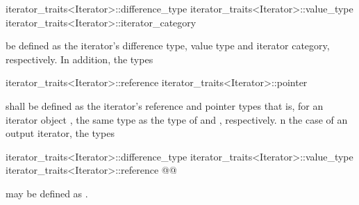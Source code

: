 %
%
%
\begin{codeblock}
iterator_traits<Iterator>::difference_type
iterator_traits<Iterator>::value_type
iterator_traits<Iterator>::iterator_category
\end{codeblock}

be defined as the iterator's difference type, value type and iterator category, respectively.
In addition, the types

%
%
\begin{codeblock}
iterator_traits<Iterator>::reference
iterator_traits<Iterator>::pointer
\end{codeblock}

shall be defined as the iterator's reference and pointer types\changed{,}{;} that is, for an
iterator object , the same type as the type of  and ,
respectively. n the case of an output
iterator, the types

\begin{codeblock}
iterator_traits<Iterator>::difference_type
iterator_traits<Iterator>::value_type
iterator_traits<Iterator>::reference
@@
\end{codeblock}

may be defined as .

